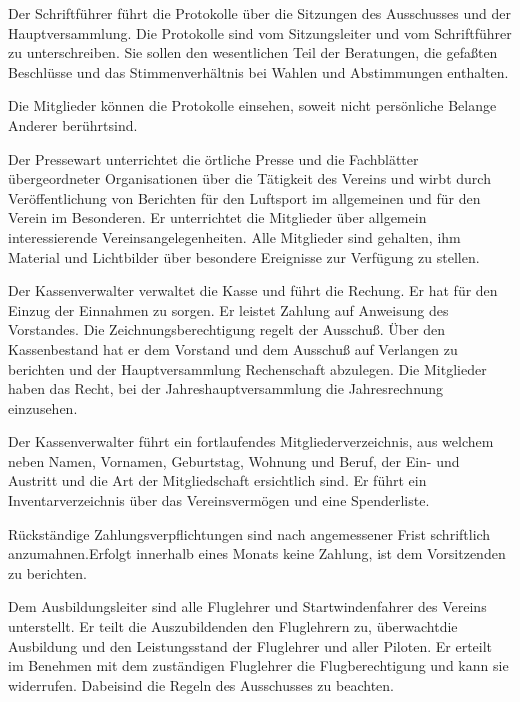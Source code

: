 \documentclass[11pt,a4paper,parskip=half]{scrartcl}
\begin{document}
\begin{contract}
\begin{multicols}{2}
    Der Schriftführer führt die Protokolle über die Sitzungen des Ausschusses und der Hauptversammlung.
    Die Protokolle sind vom Sitzungsleiter und vom Schriftführer zu unterschreiben.
    Sie sollen den wesentlichen Teil der Beratungen,
    die gefaßten Beschlüsse und das Stimmenverhältnis bei Wahlen und Abstimmungen enthalten.

    Die Mitglieder können die Protokolle einsehen,
    soweit nicht persönliche Belange Anderer berührtsind.

    Der Pressewart unterrichtet die örtliche Presse und die Fachblätter übergeordneter Organisationen über die Tätigkeit des Vereins und wirbt durch Veröffentlichung von Berichten für den Luftsport im allgemeinen und für den Verein im Besonderen.
    Er unterrichtet die Mitglieder über allgemein interessierende Vereinsangelegenheiten.
    Alle Mitglieder sind gehalten, ihm Material und Lichtbilder über besondere Ereignisse zur Verfügung zu stellen.

    Der Kassenverwalter verwaltet die Kasse und führt die Rechung.
    Er hat für den Einzug der Einnahmen zu sorgen.
    Er leistet Zahlung auf Anweisung des Vorstandes.
    Die Zeichnungsberechtigung regelt der Ausschuß.
    Über den Kassenbestand hat er dem Vorstand und dem Ausschuß auf Verlangen zu berichten und der Hauptversammlung Rechenschaft abzulegen.
    Die Mitglieder haben das Recht,
    bei der Jahreshauptversammlung die Jahresrechnung einzusehen.

    Der Kassenverwalter führt ein fortlaufendes Mitgliederverzeichnis,
    aus welchem neben Namen,
    Vornamen,
    Geburtstag,
    Wohnung und Beruf,
    der Ein- und Austritt und die Art der Mitgliedschaft ersichtlich sind.
    Er führt ein Inventarverzeichnis über das Vereinsvermögen und eine Spenderliste.

    Rückständige Zahlungsverpflichtungen sind nach angemessener Frist schriftlich anzumahnen.Erfolgt innerhalb eines Monats keine Zahlung,
    ist dem Vorsitzenden zu berichten.

    Dem Ausbildungsleiter sind alle Fluglehrer und Startwindenfahrer des Vereins unterstellt.
    Er teilt die Auszubildenden den Fluglehrern zu,
    überwachtdie Ausbildung und den Leistungsstand der Fluglehrer und aller Piloten.
    Er erteilt im Benehmen mit dem zuständigen Fluglehrer die Flugberechtigung und kann sie widerrufen.
    Dabeisind die Regeln des Ausschusses zu beachten.


\end{multicols}
\end{contract}
\end{document}
